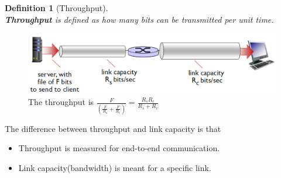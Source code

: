 \documentclass[12pt]{article}
\newtheorem{definition}{Definition}[section]
\theoremstyle{definition}
\begin{document}
\begin{definition}[Throughput]
\hfill\\\normalfont \textbf{Throughput} is defined as how many bits can be transmitted per unit time.\\
\end{definition}
\begin{figure}[h]
\includegraphics[width = \textwidth]{1_4_2.png}
\caption{The throughput is $\frac{F}{\left(\frac{F}{R_s}+\frac{F}{R_c}\right)}=\frac{R_sR_c}{R_s+R_c}$}
\end{figure}
\clearpage
The difference between throughput and link capacity is that
\begin{itemize}
  \item Throughput is measured for end-to-end communication.
  \item Link capacity(bandwidth) is meant for a specific link.
\end{itemize}
\end{document}
